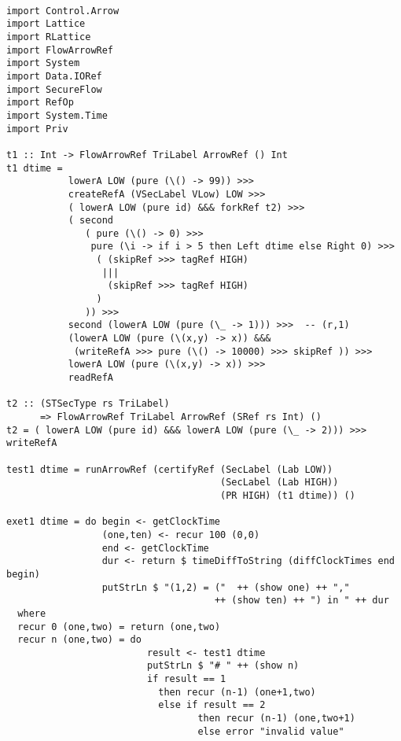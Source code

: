 \begin{Verbatim}[fontsize=\footnotesize,frame=lines,
                 framesep=5mm, label={[MultiExp.hs]MultiExp.hs}]

import Control.Arrow
import Lattice
import RLattice
import FlowArrowRef
import System
import Data.IORef
import SecureFlow
import RefOp
import System.Time
import Priv

t1 :: Int -> FlowArrowRef TriLabel ArrowRef () Int
t1 dtime = 
           lowerA LOW (pure (\() -> 99)) >>> 
           createRefA (VSecLabel VLow) LOW >>> 
           ( lowerA LOW (pure id) &&& forkRef t2) >>> 
           ( second
              ( pure (\() -> 0) >>>
               pure (\i -> if i > 5 then Left dtime else Right 0) >>>
                ( (skipRef >>> tagRef HIGH)
                 ||| 
                  (skipRef >>> tagRef HIGH)
                )  
              )) >>> 
           second (lowerA LOW (pure (\_ -> 1))) >>>  -- (r,1)
           (lowerA LOW (pure (\(x,y) -> x)) &&& 
            (writeRefA >>> pure (\() -> 10000) >>> skipRef )) >>>
           lowerA LOW (pure (\(x,y) -> x)) >>>
           readRefA 

t2 :: (STSecType rs TriLabel) 
      => FlowArrowRef TriLabel ArrowRef (SRef rs Int) ()
t2 = ( lowerA LOW (pure id) &&& lowerA LOW (pure (\_ -> 2))) >>> writeRefA

test1 dtime = runArrowRef (certifyRef (SecLabel (Lab LOW)) 
                                      (SecLabel (Lab HIGH)) 
                                      (PR HIGH) (t1 dtime)) ()

exet1 dtime = do begin <- getClockTime
                 (one,ten) <- recur 100 (0,0)
                 end <- getClockTime
                 dur <- return $ timeDiffToString (diffClockTimes end begin)
                 putStrLn $ "(1,2) = ("  ++ (show one) ++ "," 
                                     ++ (show ten) ++ ") in " ++ dur
  where
  recur 0 (one,two) = return (one,two)
  recur n (one,two) = do
                         result <- test1 dtime
                         putStrLn $ "# " ++ (show n)
                         if result == 1
                           then recur (n-1) (one+1,two)
                           else if result == 2 
                                  then recur (n-1) (one,two+1)
                                  else error "invalid value"
\end{Verbatim}
